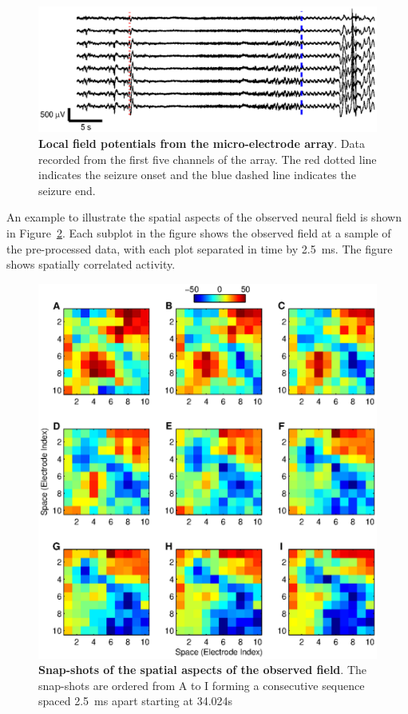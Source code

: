 \documentclass[]{article}
\begin{document}
\begin{figure}[!ht]
\begin{center}
\includegraphics{./Figures/LFPs.eps}
\end{center}
\caption{{\bf Local field potentials from the micro-electrode array}. Data recorded from the first five channels of the array. The red dotted line indicates the seizure onset and the blue dashed line indicates the seizure end.}
\label{fig:TimeSeries}
\end{figure}

An example to illustrate the spatial aspects of the observed neural field is shown in Figure~\ref{fig:FieldObserations}. Each subplot in the figure shows the observed field at a sample of the pre-processed data, with each plot separated in time by 2.5~ms. The figure shows spatially correlated activity.

\begin{figure}[!ht]
\begin{center}
\includegraphics{./Figures/FieldObservations.eps}
\end{center}
\caption{{\bf Snap-shots of the spatial aspects of the observed field}. The snap-shots are ordered from A to I forming a consecutive sequence spaced 2.5~ms apart starting at 34.024s}
\label{fig:FieldObserations}
\end{figure}
\end{document}
